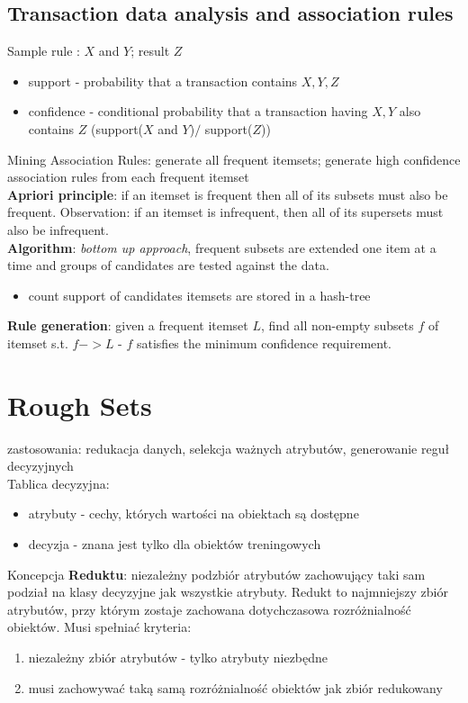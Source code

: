 \documentclass[10pt,a4paper]{article}
\begin{document}
\subsection{Transaction data analysis and association rules}
Sample rule : $X$ and $Y$; result $Z$
  \begin{itemize}
    \item support - probability that a transaction contains $X, Y, Z$
    \item confidence - conditional probability that a transaction having $X, Y$ also contains $Z$ (support($X$ and $Y$)$/$ support($Z$))
  \end{itemize}
Mining Association Rules: generate all frequent itemsets; generate high confidence association rules from each frequent itemset \\
\textbf{Apriori principle}: if an itemset is frequent then all of its subsets must also be frequent. Observation: if an itemset is infrequent, then all of its supersets must also be infrequent. \\
\textbf{Algorithm}: \textit{bottom up approach}, frequent subsets are extended one item at a time and groups of candidates are tested against the data. \\
\begin{itemize}
    \item count support of candidates itemsets are stored in a hash-tree
\end{itemize}
\textbf{Rule generation}: given a frequent itemset $L$, find all non-empty subsets $f$ of itemset s.t. $f -> L$ - $f$ satisfies the minimum confidence requirement.
\section{Rough Sets}
zastosowania: redukacja danych, selekcja ważnych atrybutów, generowanie reguł decyzyjnych\\
Tablica decyzyjna:
  \begin{itemize}
    \item atrybuty - cechy, których wartości na obiektach są dostępne
    \item decyzja - znana jest tylko dla obiektów treningowych
  \end{itemize}
  Koncepcja \textbf{Reduktu}: niezależny podzbiór atrybutów zachowujący taki sam podział na klasy decyzyjne jak wszystkie atrybuty. Redukt to najmniejszy zbiór atrybutów, przy którym zostaje zachowana dotychczasowa rozróżnialność obiektów. Musi spełniać kryteria:
    \begin{enumerate}
        \item niezależny zbiór atrybutów - tylko atrybuty niezbędne
        \item musi zachowywać taką samą rozróżnialność obiektów jak zbiór redukowany
    \end{enumerate}
\end{document}

